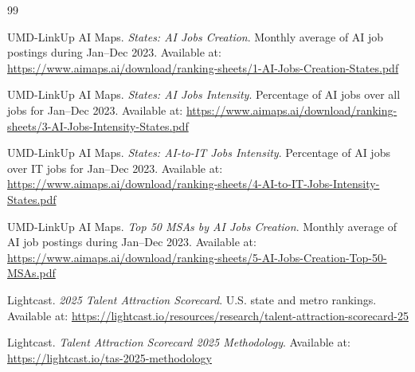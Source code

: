 \documentclass[12pt,a4paper]{article}
\begin{document}
\begin{thebibliography}{99}

UMD-LinkUp AI Maps.
\newblock \textit{States: AI Jobs Creation}.
\newblock Monthly average of AI job postings during Jan--Dec 2023.
\newblock Available at: \url{https://www.aimaps.ai/download/ranking-sheets/1-AI-Jobs-Creation-States.pdf}

UMD-LinkUp AI Maps.
\newblock \textit{States: AI Jobs Intensity}.
\newblock Percentage of AI jobs over all jobs for Jan--Dec 2023.
\newblock Available at: \url{https://www.aimaps.ai/download/ranking-sheets/3-AI-Jobs-Intensity-States.pdf}

UMD-LinkUp AI Maps.
\newblock \textit{States: AI-to-IT Jobs Intensity}.
\newblock Percentage of AI jobs over IT jobs for Jan--Dec 2023.
\newblock Available at: \url{https://www.aimaps.ai/download/ranking-sheets/4-AI-to-IT-Jobs-Intensity-States.pdf}

UMD-LinkUp AI Maps.
\newblock \textit{Top 50 MSAs by AI Jobs Creation}.
\newblock Monthly average of AI job postings during Jan--Dec 2023.
\newblock Available at: \url{https://www.aimaps.ai/download/ranking-sheets/5-AI-Jobs-Creation-Top-50-MSAs.pdf}

Lightcast.
\newblock \textit{2025 Talent Attraction Scorecard}.
\newblock U.S. state and metro rankings.
\newblock Available at: \url{https://lightcast.io/resources/research/talent-attraction-scorecard-25}

Lightcast.
\newblock \textit{Talent Attraction Scorecard 2025 Methodology}.
\newblock Available at: \url{https://lightcast.io/tas-2025-methodology}

\end{thebibliography}
\end{document}
